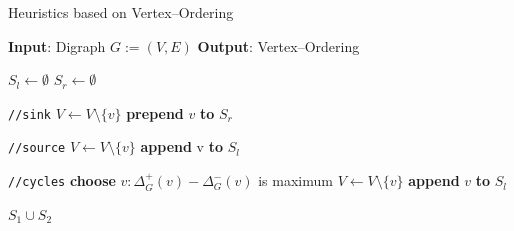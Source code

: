 \documentclass{beamer}
\begin{document}
\begin{frame}[fragile, shrink=7.5]{Heuristics based on Vertex–Ordering}


    {\fontsize{3pt}{4pt}\selectfont
    \begin{algorithm}[H]

        \caption*{\textit{Berger–Shor Algorithm}} 
        
        \begin{algorithmic}[1]

            \State \textbf{Input}: Digraph $G := (V, E)$
            \State \textbf{Output}: Vertex–Ordering

            \State $S_l \gets \emptyset$
            \State $S_r \gets \emptyset$

                 \texttt{//sink}
                    \State $V \gets V \setminus \{v\}$
                    \State \textbf{prepend} $v$ \textbf{to} $S_r$
                \EndWhile

                \Statex

                 \texttt{//source}
                    \State $V \gets V \setminus \{v\}$
                    \State \textbf{append} v \textbf{to} $S_l$
                \EndWhile

                \Statex

                 \texttt{//cycles}
                    \State \textbf{choose} $v : \Delta^+_G(v) - \Delta^-_G(v)$ is maximum
                    \State $V \gets V \setminus \{v\}$
                    \State \textbf{append} $v$ \textbf{to} $S_l$
                \EndIf
            \EndWhile

            \State \Return $S_1 \cup S_2$


        \end{algorithmic}
    \end{algorithm}
    }

\end{frame}
\end{document}
